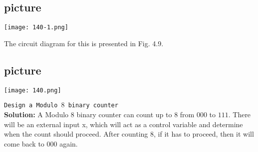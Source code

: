 \documentclass{article}
\begin{document}
\begin{center}
\section{picture}
\texttt{[image: 140-1.png]}
\end{center}

The circuit diagram for this is presented in Fig. 4.9.

\begin{center}
\section{picture}
\texttt{[image: 140.png]}
\end{center}

\hspace*{0.1cm} \texttt{Design a Modulo $8$ binary counter}\\

\textbf{Solution:} A Modulo $8$ binary counter can count up to $8$ from $000$ to $111$. There will be an external input x,
which will act as a control variable and determine when the count should proceed. After counting $8$, if it
has to proceed, then it will come back to $000$ again.
\end{document}
